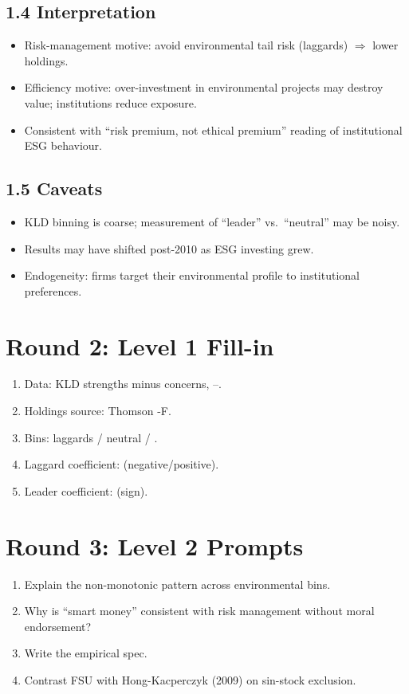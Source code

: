 \documentclass[11pt]{article}
\newcommand{\blank}[1]{\underline{\hspace{#1}}}
\begin{document}
\subsection*{1.4 Interpretation}
\begin{itemize}
\item Risk-management motive: avoid environmental tail risk (laggards) $\Rightarrow$ lower holdings.
\item Efficiency motive: over-investment in environmental projects may destroy value; institutions reduce exposure.
\item Consistent with ``risk premium, not ethical premium'' reading of institutional ESG behaviour.
\end{itemize}

\subsection*{1.5 Caveats}
\begin{alertbox}
\begin{itemize}
\item KLD binning is coarse; measurement of ``leader'' vs.\ ``neutral'' may be noisy.
\item Results may have shifted post-2010 as ESG investing grew.
\item Endogeneity: firms target their environmental profile to institutional preferences.
\end{itemize}
\end{alertbox}

\section*{Round 2: Level 1 Fill-in}
\begin{enumerate}
\item Data: KLD strengths minus concerns, \blank{1cm}--\blank{1cm}.
\item Holdings source: Thomson \blank{1cm}-F.
\item Bins: laggards / neutral / \blank{1cm}.
\item Laggard coefficient: \blank{1cm} (negative/positive).
\item Leader coefficient: \blank{1cm} (sign).
\end{enumerate}

\section*{Round 3: Level 2 Prompts}
\begin{enumerate}
\item Explain the non-monotonic pattern across environmental bins.
\item Why is ``smart money'' consistent with risk management without moral endorsement?
\item Write the empirical spec.
\item Contrast FSU with Hong-Kacperczyk (2009) on sin-stock exclusion.
\end{enumerate}
\end{document}
